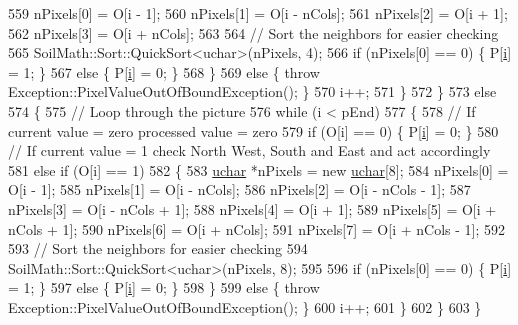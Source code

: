\begin{DoxyCode}
559                     nPixels[0] = O[i - 1];
560                     nPixels[1] = O[i - nCols];
561                     nPixels[2] = O[i + 1];
562                     nPixels[3] = O[i + nCols];
563 
564                     \textcolor{comment}{// Sort the neighbors for easier checking}
565                     SoilMath::Sort::QuickSort<uchar>(nPixels, 4);
566                     \textcolor{keywordflow}{if} (nPixels[0] == 0) \{ P[\hyperlink{_comparision_pictures_2_createtest_image_8m_a6f6ccfcf58b31cb6412107d9d5281426}{i}] = 1; \}
567                     \textcolor{keywordflow}{else} \{ P[\hyperlink{_comparision_pictures_2_createtest_image_8m_a6f6ccfcf58b31cb6412107d9d5281426}{i}] = 0; \}
568                 \}
569                 \textcolor{keywordflow}{else} \{ \textcolor{keywordflow}{throw} Exception::PixelValueOutOfBoundException(); \}
570                 i++;
571             \}
572         \}
573         \textcolor{keywordflow}{else}
574         \{
575             \textcolor{comment}{// Loop through the picture}
576             \textcolor{keywordflow}{while} (i < pEnd)
577             \{
578                 \textcolor{comment}{// If current value = zero processed value = zero}
579                 \textcolor{keywordflow}{if} (O[i] == 0) \{ P[\hyperlink{_comparision_pictures_2_createtest_image_8m_a6f6ccfcf58b31cb6412107d9d5281426}{i}] = 0; \}
580                 \textcolor{comment}{// If current value = 1 check North West, South and East and act accordingly}
581                 \textcolor{keywordflow}{else} \textcolor{keywordflow}{if} (O[i] == 1)
582                 \{
583                     \hyperlink{_soil_math_types_8h_a65f85814a8290f9797005d3b28e7e5fc}{uchar} *nPixels = \textcolor{keyword}{new} \hyperlink{_soil_math_types_8h_a65f85814a8290f9797005d3b28e7e5fc}{uchar}[8];
584                     nPixels[0] = O[i - 1];
585                     nPixels[1] = O[i - nCols];
586                     nPixels[2] = O[i - nCols - 1];
587                     nPixels[3] = O[i - nCols + 1];
588                     nPixels[4] = O[i + 1];
589                     nPixels[5] = O[i + nCols + 1];
590                     nPixels[6] = O[i + nCols];
591                     nPixels[7] = O[i + nCols - 1];
592 
593                     \textcolor{comment}{// Sort the neighbors for easier checking}
594                     SoilMath::Sort::QuickSort<uchar>(nPixels, 8);
595 
596                     \textcolor{keywordflow}{if} (nPixels[0] == 0) \{ P[\hyperlink{_comparision_pictures_2_createtest_image_8m_a6f6ccfcf58b31cb6412107d9d5281426}{i}] = 1; \}
597                     \textcolor{keywordflow}{else} \{ P[\hyperlink{_comparision_pictures_2_createtest_image_8m_a6f6ccfcf58b31cb6412107d9d5281426}{i}] = 0; \}
598                 \}
599                 \textcolor{keywordflow}{else} \{ \textcolor{keywordflow}{throw} Exception::PixelValueOutOfBoundException(); \}
600                 i++;
601             \}
602         \}
603     \}
\end{DoxyCode}


